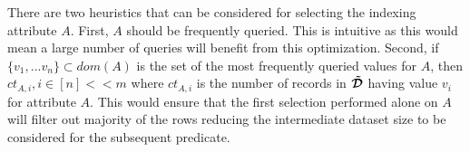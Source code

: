 There are two heuristics that can be considered for selecting the indexing attribute $A$. First, $A$ should be frequently queried. This is intuitive as this would mean a large number of queries will benefit from this optimization. Second, if $\{v_1,...v_n\} \subset dom(A)$ is the set of the most frequently queried values for $A$, then $ct_{A,i}, i \in [n] << m$ where $ct_{A,i}$ is the number of records in $\boldsymbol{\tilde{\mathcal{D}}}$ having value $v_i$ for attribute $A$. This would ensure that the first selection performed alone on $A$ will filter out majority of the rows reducing the intermediate dataset size to be considered for the subsequent predicate.


